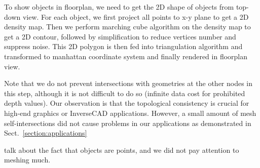 To show objects in floorplan, we need to get the
2D shape of objects from top-down view. For each object, we first
project all points to x-y plane to get a 2D density map. Then we perform
marching cube algorithm on the density map to get a 2D contour, followed
by simplification to reduce vertices number and suppress noise. This 2D
polygon is then fed into triangulation algorithm and transformed to
manhattan coordinate system and finally rendered in floorplan view.





Note that we do not prevent intersections with geometries at the other
nodes in this step, although it is not difficult to do so (infinite data
cost for prohibited depth values). Our observation is that the
topological consistency is crucial for high-end graphics or InverseCAD
applications. However, a small amount of mesh self-intersections did not
cause problems in our applications as demonstrated in
Sect.~\ref{section:applications}


talk about the fact that objects are points, and we did not pay
attention to meshing much.
